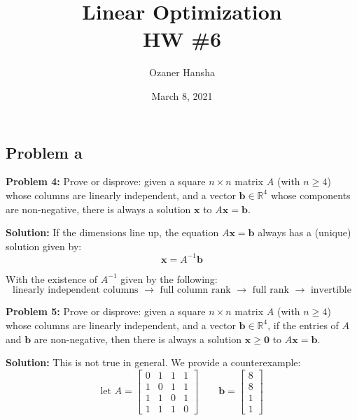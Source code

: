 \documentclass{article}
\renewcommand\vec{\mathbf}
\newcommand{\R}{\mathbb R}
\begin{document}
\title{Linear Optimization\\HW \#6}
\author{Ozaner Hansha}
\date{March 8, 2021}
\maketitle

\subsection*{Problem a}
\noindent\textbf{Problem 4:} Prove or disprove: given a square $n\times n$ matrix $A$ (with $n\ge4$) whose columns are linearly independent, and a vector $\vec b\in\R^4$ whose components are non-negative, there is always a solution $\vec x$ to $A\vec x=\vec  b$.
\bigskip

\noindent\textbf{Solution:} If the dimensions line up, the equation $A\vec x=\vec b$ always has a (unique) solution given by:
\begin{equation*}
    \vec x=A^{-1}\vec b
\end{equation*}

With the existence of $A^{-1}$ given by the following:
$$\text{linearly independent columns $\rightarrow$ full column rank $\rightarrow$ full rank $\rightarrow$ invertible}$$

\bigskip

\noindent\textbf{Problem 5:} Prove or disprove: given a square $n\times n$ matrix $A$ (with $n\ge4$) whose columns are linearly independent, and a vector $\vec b\in\R^4$, if the entries of $A$ and $\vec b$ are non-negative, then there is always a solution $\vec x\ge\vec 0$ to $A\vec x=\vec  b$.
\bigskip

\noindent\textbf{Solution:} This is not true in general. We provide a counterexample:
$$\text{let } A=\begin{bmatrix}
    0&1&1&1\\
    1&0&1&1\\
    1&1&0&1\\
    1&1&1&0
\end{bmatrix}\qquad
\vec b=\begin{bmatrix}
    8\\8\\1\\1
\end{bmatrix}
$$
\end{document}
